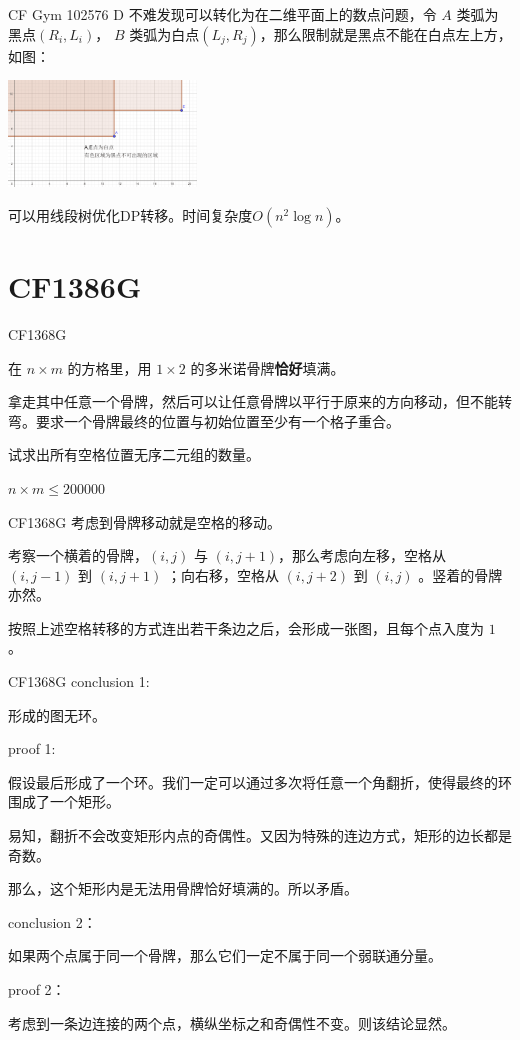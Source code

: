 \documentclass[9pt]{beamer}
\begin{document}
  \begin{frame}{CF Gym 102576 D}
     不难发现可以转化为在二维平面上的数点问题，令 $A$ 类弧为黑点$(R_i,L_i)$， $B$ 类弧为白点$(L_j,R_j)$，那么限制就是黑点不能在白点左上方，如图：
    \begin{center}
      \includegraphics[width=5cm]{photo3.png}
    \end{center}
  
  ​	 可以用线段树优化DP转移。时间复杂度$O(n^2\log n)$。
  \end{frame}

  \section{CF1386G}
  \begin{frame}{CF1368G}
    \par 在 $n\times m$ 的方格里，用 $1\times2$ 的多米诺骨牌\textbf{恰好}填满。
    \par 拿走其中任意一个骨牌，然后可以让任意骨牌以平行于原来的方向移动，但不能转弯。要求一个骨牌最终的位置与初始位置至少有一个格子重合。
    \par 试求出所有空格位置无序二元组的数量。
    \par $n\times m\le200000$ 
  \end{frame}

  \begin{frame}{CF1368G}
     考虑到骨牌移动就是空格的移动。

     考察一个横着的骨牌，$(i,j)$ 与 $(i,j+1)$，那么考虑向左移，空格从 $(i,j-1)$ 到 $(i,j+1)$ ；向右移，空格从 $(i,j+2)$ 到 $(i,j)$ 。竖着的骨牌亦然。

     按照上述空格转移的方式连出若干条边之后，会形成一张图，且每个点入度为 $1$ 。
  \end{frame}

  \begin{frame}{CF1368G}
     conclusion 1:

     形成的图无环。

     proof 1:

     假设最后形成了一个环。我们一定可以通过多次将任意一个角翻折，使得最终的环围成了一个矩形。

     易知，翻折不会改变矩形内点的奇偶性。又因为特殊的连边方式，矩形的边长都是奇数。

     那么，这个矩形内是无法用骨牌恰好填满的。所以矛盾。

     conclusion 2：
    
     如果两个点属于同一个骨牌，那么它们一定不属于同一个弱联通分量。

     proof 2：

     考虑到一条边连接的两个点，横纵坐标之和奇偶性不变。则该结论显然。
  \end{frame}
  
\end{document}
